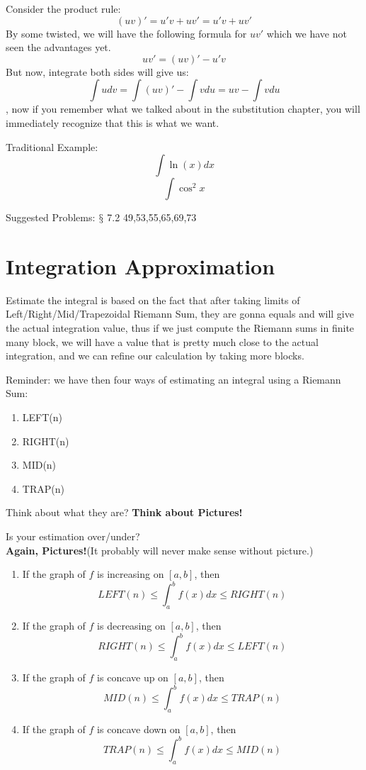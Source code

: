 \documentclass[12pt]{article}
\theoremstyle{definition}
\theoremstyle{definition}
\theoremstyle{remark}
\theoremstyle{definition}
\theoremstyle{definition}
\theoremstyle{definition}
\begin{document}
Consider the product rule:
\[(uv)'=u'v+uv'=u'v+uv' \]
By some twisted, we will have the following formula for $uv'$ which we have not seen the advantages yet.
\[uv'=(uv)'−u'v\]
But now, integrate both sides will give us:
\[\int udv=\int(uv)′−\int vdu= uv - \int v du\], now if you remember what we talked about in the substitution chapter, you will immediately recognize that this is what we want.

Traditional Example:\[\int \ln(x) dx\] \[\int \cos^2 x\]

Suggested Problems: $\mathsection$ 7.2 49,53,55,65,69,73

\newpage

\section{Integration Approximation}

Estimate the integral is based on the fact that after taking limits of Left/Right/Mid/Trapezoidal Riemann Sum, they are gonna equals and will give the actual integration value, thus if we just compute the Riemann sums in finite many block, we will have a value that is pretty much close to the actual integration, and we can refine our calculation by taking more blocks.

Reminder: we have then four ways of estimating an integral using a Riemann Sum:
\begin{enumerate}
\item LEFT(n)
\item RIGHT(n)
\item MID(n)
\item TRAP(n)
\end{enumerate}
Think about what they are?
\textbf{Think about Pictures!}

Is your estimation over/under?\\

\textbf{Again, Pictures!}(It probably will never make sense without picture.)
\begin{enumerate}
\item If the graph of $f$ is increasing on $[a,b]$, then $$LEFT(n)\leq \int^b_a f(x) dx \leq RIGHT(n)$$
\item If the graph of $f$ is decreasing on $[a,b]$, then $$RIGHT(n)\leq \int^b_a f(x) dx \leq LEFT(n)$$
\item If the graph of $f$ is concave up on $[a,b]$, then $$MID(n)\leq \int^b_a f(x) dx \leq TRAP(n)$$
\item If the graph of $f$ is concave down on $[a,b]$, then $$TRAP(n)\leq \int^b_a f(x) dx \leq MID(n)$$

\end{enumerate}
\end{document}
